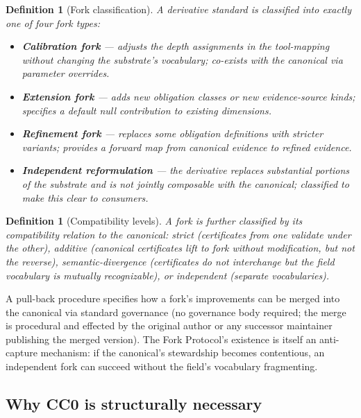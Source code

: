 \documentclass[11pt,a4paper]{article}
\newtheorem{definition}[theorem]{Definition}
\begin{document}
\begin{definition}[Fork classification]\label{def:fork-types}
A derivative standard is classified into exactly one of four \emph{fork types}:
\begin{itemize}
  \item \textbf{Calibration fork} --- adjusts the depth assignments in the tool-mapping without changing the substrate's vocabulary; co-exists with the canonical via parameter overrides.
  \item \textbf{Extension fork} --- adds new obligation classes or new evidence-source kinds; specifies a default null contribution to existing dimensions.
  \item \textbf{Refinement fork} --- replaces some obligation definitions with stricter variants; provides a forward map from canonical evidence to refined evidence.
  \item \textbf{Independent reformulation} --- the derivative replaces substantial portions of the substrate and is not jointly composable with the canonical; classified to make this clear to consumers.
\end{itemize}
\end{definition}

\begin{definition}[Compatibility levels]\label{def:compat-levels}
A fork is further classified by its compatibility relation to the canonical: \emph{strict} (certificates from one validate under the other), \emph{additive} (canonical certificates lift to fork without modification, but not the reverse), \emph{semantic-divergence} (certificates do not interchange but the field vocabulary is mutually recognizable), or \emph{independent} (separate vocabularies).
\end{definition}

A pull-back procedure specifies how a fork's improvements can be merged into the canonical via standard governance (no governance body required; the merge is procedural and effected by the original author or any successor maintainer publishing the merged version). The Fork Protocol's existence is itself an anti-capture mechanism: if the canonical's stewardship becomes contentious, an independent fork can succeed without the field's vocabulary fragmenting.

\subsection{Why CC0 is structurally necessary}
\end{document}
